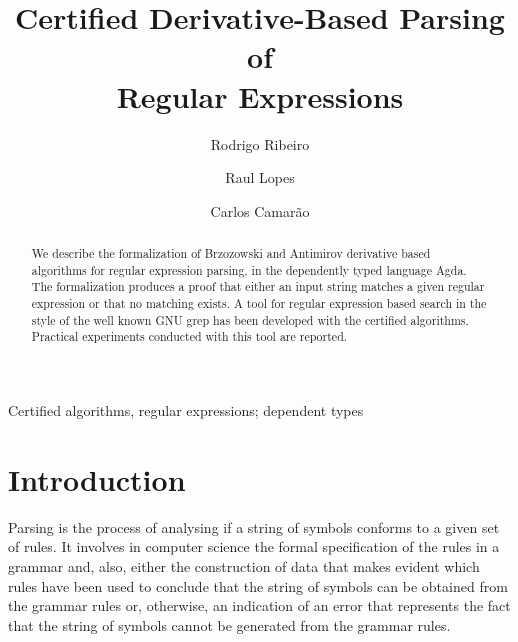 \documentclass[review]{elsarticle}
\begin{document}
\begin{frontmatter}

\title{Certified Derivative-Based Parsing of\\ Regular Expressions}

\author[rgr]{Rodrigo Ribeiro}
\address[rgr]{Dep. de Computa\c{c}\~ao e Sistemas, Universidade
  Federal de Ouro Preto, ICEA, Jo\~ao Monlevade, Minas Gerais, Brasil}

\author{Raul Lopes}
\address{Dep. de Computa\c{c}\~ao, Universidade
  Federal de Ouro Preto, ICEB, Campus Universit\'ario Morro do
  Cruzeiro, Ouro Preto, Minas Gerais, Brasil}


\author{Carlos Camar\~ao}
\address{Dep. de Ci\^encia da Computa\c{c}\~ao, Universidade Federal
  de Minas Gerais, Av. Ant\^onio Carlos 6627, Belo Horizonte, Minas Gerais, Brasil}


\begin{abstract}

We describe the formalization of Brzozowski and Antimirov derivative
based algorithms for regular expression parsing, in the dependently
typed language Agda. The formalization produces a proof that either an
input string matches a given regular expression or that no matching
exists. A tool for regular expression based search in the style of the
well known GNU grep has been developed with the certified algorithms.
Practical experiments conducted with this tool are reported.

\end{abstract}

\begin{keyword}
Certified algorithms, regular expressions; dependent types
\end{keyword}

\end{frontmatter}


\section{Introduction}\label{sec:intro}

Parsing is the process of analysing if a string of symbols conforms to
a given set of rules. It involves in computer science the formal
specification of the rules in a grammar and, also, either the
construction of data that makes evident which rules have been used to
conclude that the string of symbols can be obtained from the grammar
rules or, otherwise, an indication of an error that represents the
fact that the string of symbols cannot be generated from the grammar
rules.
\end{document}

